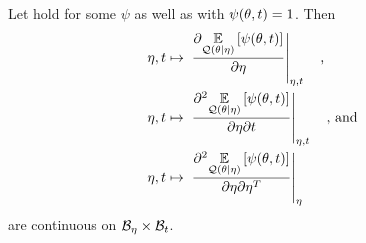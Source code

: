 



\begin{lem}
%
Let  hold for some $\psi$ as well as with $\psi(\theta,
t) = 1$.  Then
%
\begin{align*}
%
\eta, \t \mapsto{}& \fracat{\partial
\expect{\q(\theta \vert \eta)} {\psi(\theta, \t)}}{\partial \eta}{\eta, \t}
%
\mathtxt{,}\\
%
\eta, \t \mapsto{}& \fracat{\partial^2
\expect{\q(\theta \vert \eta)} {\psi(\theta, \t)}}{\partial \eta \partial
\t}{\eta, \t}
%
\mathtxt{, and}\\
%
\eta, \t \mapsto{}&  \fracat{\partial^2
\expect{\q(\theta \vert \eta)} {\psi(\theta, \t)}}{\partial \eta \partial
\eta^T}{\eta}
%
\end{align*}
%
are continuous on $\mathcal{B}_\eta \times \mathcal{B}_t$.
%
\end{lem}

